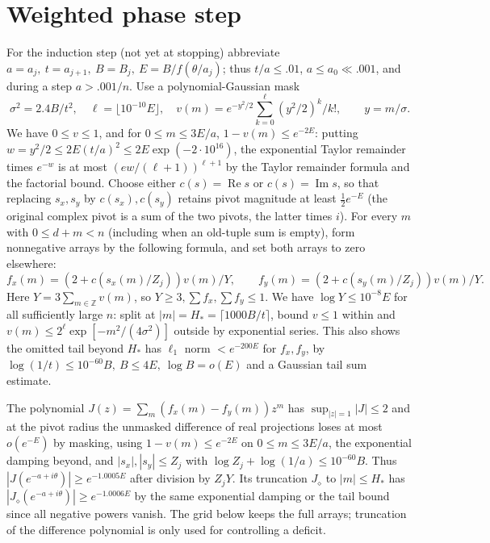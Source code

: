 \documentclass[11pt]{article}
\begin{document}
\section*{Weighted phase step} For the induction step (not yet at stopping) abbreviate \(a=a_j,\ t=a_{j+1},\ B=B_j,\ E=B/f(\theta/a_j)\); thus \(t/a\le.01\), \(a\le a_0\ll .001\), and during a step \(a>.001/n\). Use a polynomial-Gaussian mask
\[
 \sigma^2=2.4 B/t^2,\quad \ell=\lfloor10^{-10}E\rfloor,\quad
 v(m)=e^{-y^2/2}\sum_{k=0}^{\ell}(y^2/2)^k/k!,\qquad y=m/\sigma .
\]
We have \(0\le v\le1\), and for \(0\le m\le3E/a\), \(1-v(m)\le e^{-2E}\): putting \(w=y^2/2\le2 E(t/a)^2\le2 E\exp(-2\cdot10^{16})\), the exponential Taylor remainder times \(e^{-w}\) is at most \((e w/(\ell+1))^{\ell+1}\) by the Taylor remainder formula and the factorial bound. Choose either \(c(s)=\operatorname{Re}s\) or \(c(s)=\operatorname{Im}s\), so that replacing \(s_x,s_y\) by \(c(s_x),c(s_y)\) retains pivot magnitude at least \(\frac12 e^{-E}\) (the original complex pivot is a sum of the two pivots, the latter times \(i\)). For every \(m\) with \(0\le d+m<n\) (including when an old-tuple sum is empty), form nonnegative arrays by the following formula, and set both arrays to zero elsewhere:
\[
f_x(m)=(2+c(s_x(m)/Z_j))v(m)/Y,\qquad f_y(m)=(2+c(s_y(m)/Z_j))v(m)/Y.
\]
Here \(Y=3\sum_{m\in\mathbb Z}v(m)\), so \(Y\ge3, \sum f_x,\sum f_y\le1\). We have \(\log Y\le10^{-8}E\) for all sufficiently large \(n\): split at \(|m|=H_*=\lceil1000B/t\rceil\), bound \(v\le1\) within and \(v(m)\le 2^\ell\exp[-m^2/(4\sigma^2)]\) outside by exponential series. This also shows the omitted tail beyond \(H_*\) has \(\ell_1\) norm \(<e^{-200 E}\) for \(f_x,f_y\), by \(\log(1/t)\le10^{-60}B,\ B\le4E,\ \log B=o(E)\) and a Gaussian tail sum estimate.

The polynomial \(J(z)=\sum_m(f_x(m)-f_y(m))z^m\) has \(\sup_{|z|=1}|J|\le2\) and at the pivot radius the unmasked difference of real projections loses at most \(o(e^{-E})\) by masking, using \(1-v(m)\le e^{-2E}\) on \(0\le m\le3E/a\), the exponential damping beyond, and \(|s_x|,|s_y|\le Z_j\) with \(\log Z_j+\log(1/a)\le 10^{-60} B\). Thus \(|J(e^{-a+i\theta})|\ge e^{-1.0005E}\) after division by \(Z_j Y\). Its truncation \(J_\diamond\) to \(|m|\le H_*\) has \(|J_\diamond(e^{-a+i\theta})|\ge e^{-1.0006E}\) by the same exponential damping or the tail bound since all negative powers vanish. The grid below keeps the full arrays; truncation of the difference polynomial is only used for controlling a deficit.
\end{document}
